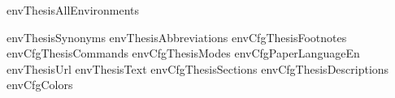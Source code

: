 \startenvironment envThesisAllEnvironments

\environment envThesisSynonyms
\environment envThesisAbbreviations
\environment envCfgThesisFootnotes
\environment envCfgThesisCommands
\environment envCfgThesisModes
\environment envCfgPaperLanguageEn
\environment envThesisUrl
\environment envThesisText
\environment envCfgThesisSections
\environment envCfgThesisDescriptions
\environment envCfgColors

\stopenvironment